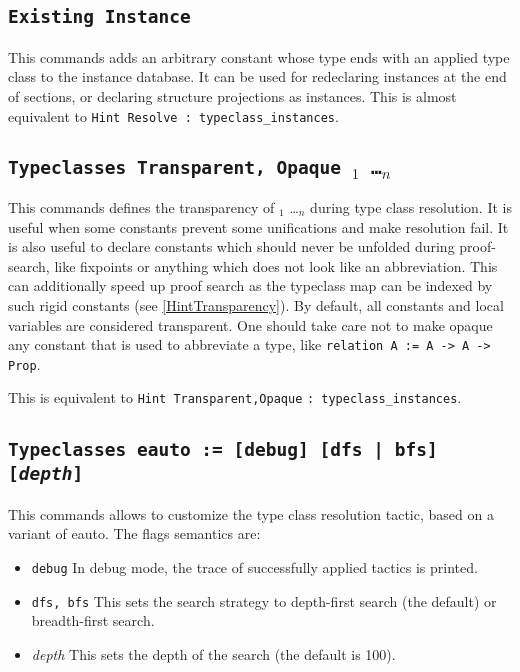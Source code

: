 \subsection{\tt Existing Instance {\ident}}
\label{ExistingInstance}

This commands adds an arbitrary constant whose type ends with an applied
type class to the instance database. It can be used for redeclaring
instances at the end of sections, or declaring structure projections as
instances. This is almost equivalent to {\tt Hint Resolve {\ident} :
  typeclass\_instances}.

\subsection{\tt Typeclasses Transparent, Opaque {\ident$_1$ \ldots \ident$_n$}}
\label{TypeclassesTransparency}

This commands defines the transparency of {\ident$_1$ \ldots \ident$_n$} 
during type class resolution. It is useful when some constants prevent some
unifications and make resolution fail. It is also useful to declare
constants which should never be unfolded during proof-search, like
fixpoints or anything which does not look like an abbreviation. This can
additionally speed up proof search as the typeclass map can be indexed
by such rigid constants (see \ref{HintTransparency}).
By default, all constants and local variables are considered transparent.
One should take care not to make opaque any constant that is used to
abbreviate a type, like {\tt relation A := A -> A -> Prop}.

This is equivalent to {\tt Hint Transparent,Opaque} {\ident} {\tt: typeclass\_instances}.

\subsection{\tt Typeclasses eauto := [debug] [dfs | bfs] [\emph{depth}]}
\label{TypeclassesEauto}

This commands allows to customize the type class resolution tactic,
based on a variant of eauto. The flags semantics are:
\begin{itemize}
\item {\tt debug} In debug mode, the trace of successfully applied
  tactics is printed.
\item {\tt dfs, bfs} This sets the search strategy to depth-first search
  (the default) or breadth-first search.
\item {\emph{depth}} This sets the depth of the search (the default is 100).
\end{itemize}

